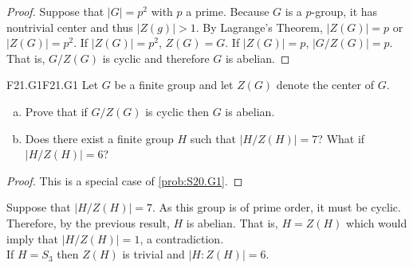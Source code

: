 \documentclass[../AlgebraQualSolutions.tex]{subfiles}
\begin{document}
	\begin{proof}
	Suppose that $|G| = p^2$ with $p$ a prime. Because $G$ is a $p$-group, it has nontrivial center and thus $|Z(g)| > 1$. By Lagrange's Theorem, $|Z(G)| = p$ or $|Z(G)| = p^2$. If $|Z(G)| =p^2$, $Z(G) = G$. If $|Z(G)| = p$, $\left|G/Z(G) \right| = p$. That is, $G/Z(G)$ is cyclic and therefore $G$ is abelian.
	\end{proof}
	
	\begin{prob}{F21.G1}{F21.G1}
	Let $G$ be a finite group and let $Z(G)$ denote the center of $G$.
	\begin{enumerate}[(a)]
	\item Prove that if $G/Z(G)$ is cyclic then $G$ is abelian.
	\item Does there exist a finite group $H$ such that $|H/Z(H)| = 7$? What if $|H/Z(H)| = 6$?
	\end{enumerate}
	\end{prob}
	
	\begin{proof}
	This is a special case of \ref{prob:S20.G1}.
	\end{proof}
	
	\begin{solution}
	Suppose that $|H/Z(H)| = 7$. As this group is of prime order, it must be cyclic. Therefore, by the previous result, $H$ is abelian. That is, $H = Z(H)$ which would imply that $|H/Z(H)| = 1$, a contradiction.\\
	
	If $H = S_3$ then $Z(H)$ is trivial and $|H: Z(H)| = 6$.
	\end{solution}
\end{document}
